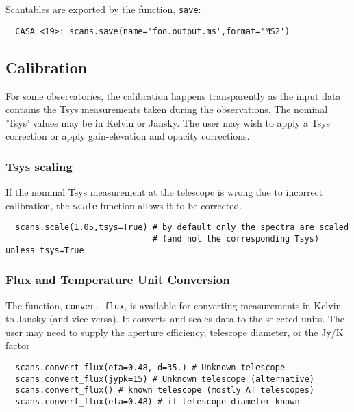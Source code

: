 Scantables are exported by the function, {\tt save}:
\small
\begin{verbatim}
  CASA <19>: scans.save(name='foo.output.ms',format='MS2')
\end{verbatim}
\normalsize

\subsection{Calibration}
\label{subsection:sd.asap.calib}

For some observatories, the calibration happens transparently as the
input data contains the Tsys measurements taken during the
observations. The nominal 'Tsys' values may be in Kelvin or
Jansky. The user may wish to apply a Tsys correction or apply
gain-elevation and opacity corrections.

\subsubsection{Tsys scaling}
\label{subsubsection:sd.asap.calib.tsys}

If the nominal Tsys measurement at the telescope is wrong due to
incorrect calibration, the {\tt scale} function allows it to be corrected.  

\small
\begin{verbatim}
  scans.scale(1.05,tsys=True) # by default only the spectra are scaled
                              # (and not the corresponding Tsys) unless tsys=True
\end{verbatim}
\normalsize


\subsubsection{Flux and Temperature Unit Conversion}
\label{subsubsection:sd.asap.calib.fluxunit}

The function, {\tt convert\_flux}, is available for converting 
measurements in Kelvin to Jansky (and vice versa). 
It converts and scales data to the selected units. 
The user may need to supply the aperture
efficiency, telescope diameter, or the Jy/K factor

\small
\begin{verbatim}
  scans.convert_flux(eta=0.48, d=35.) # Unknown telescope
  scans.convert_flux(jypk=15) # Unknown telescope (alternative)
  scans.convert_flux() # known telescope (mostly AT telescopes)
  scans.convert_flux(eta=0.48) # if telescope diameter known
\end{verbatim}
\normalsize


